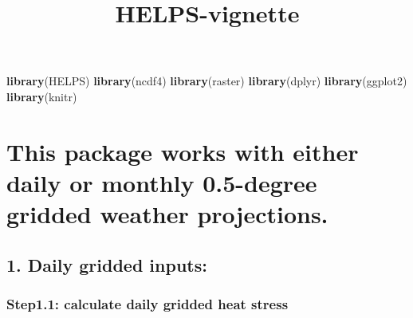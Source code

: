 \documentclass[
]{article}
\title{HELPS-vignette}
\author{}
\date{\vspace{-2.5em}}
\newenvironment{Shaded}{\begin{snugshade}}{\end{snugshade}}
\newcommand{\FunctionTok}[1]{\textcolor[rgb]{0.13,0.29,0.53}{\textbf{#1}}}
\newcommand{\NormalTok}[1]{#1}
\begin{document}
\maketitle

\begin{Shaded}
\begin{Highlighting}[]
\FunctionTok{library}\NormalTok{(HELPS)}
\FunctionTok{library}\NormalTok{(ncdf4)}
\FunctionTok{library}\NormalTok{(raster)}
\FunctionTok{library}\NormalTok{(dplyr)}
\FunctionTok{library}\NormalTok{(ggplot2)}
\FunctionTok{library}\NormalTok{(knitr)}
\end{Highlighting}
\end{Shaded}

\section{This package works with either daily or monthly 0.5-degree
gridded weather
projections.}\label{this-package-works-with-either-daily-or-monthly-0.5-degree-gridded-weather-projections.}

\subsection{1. Daily gridded inputs:}\label{daily-gridded-inputs}

\subsubsection{Step1.1: calculate daily gridded heat
stress}\label{step1.1-calculate-daily-gridded-heat-stress}
\end{document}

